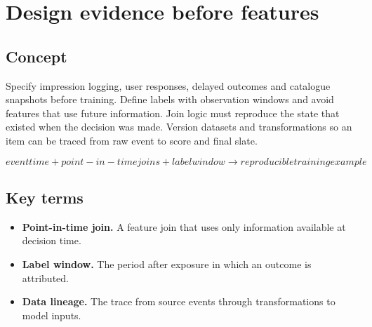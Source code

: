 \section{Design evidence before features}

\begin{abstract}
Reliable impressions, outcomes and timestamps matter more than a long feature list.
\end{abstract}

\subsection{Concept}
Specify impression logging, user responses, delayed outcomes and catalogue snapshots before training. Define labels with observation windows and avoid features that use future information. Join logic must reproduce the state that existed when the decision was made. Version datasets and transformations so an item can be traced from raw event to score and final slate.

\begin{equation*}
event time + point-in-time joins + label window  \rightarrow  reproducible training example
\end{equation*}

\subsection{Key terms}
\begin{itemize}
\item \textbf{Point-in-time join.} A feature join that uses only information available at decision time.
\item \textbf{Label window.} The period after exposure in which an outcome is attributed.
\item \textbf{Data lineage.} The trace from source events through transformations to model inputs.
\end{itemize}
